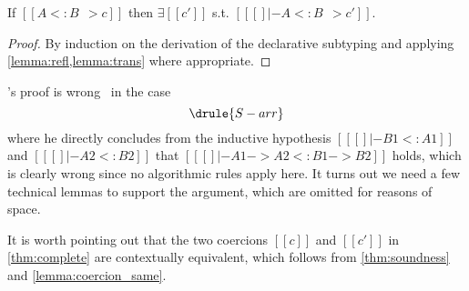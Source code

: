 \begin{mtheorem}[Completeness] \label{thm:complete}
  If $[[A <: B ~~> c]]$ then $\exists [[c']]$ s.t. $[[ [] |- A <: B ~~> c']]$.
\end{mtheorem}
\begin{proof}
  By induction on the derivation of the declarative subtyping and applying \cref{lemma:refl,lemma:trans} where appropriate.
\end{proof}
\begin{remark}
  \citeauthor{pierce1989decision}'s proof is wrong~\citep[pp.~20, Case~F]{pierce1989decision} in the case
  \[
  \drule{S-arr}
  \]
  where he directly concludes from the inductive hypothesis $[[ [] |- B1 <:
  A1]]$ and $[[ [] |- A2 <: B2]]$ that $[[ [] |- A1 -> A2 <: B1 -> B2]]$ holds,
  which is clearly wrong since no algorithmic rules apply here. It turns out we
  need a few technical lemmas to support the argument, which are omitted for 
  reasons of space.
\end{remark}

\begin{remark}
  It is worth pointing out that the two coercions $[[c]]$ and $[[c']]$ in
  \cref{thm:complete} are contextually equivalent, which follows from
  \cref{thm:soundness} and \cref{lemma:coercion_same}.
\end{remark}

